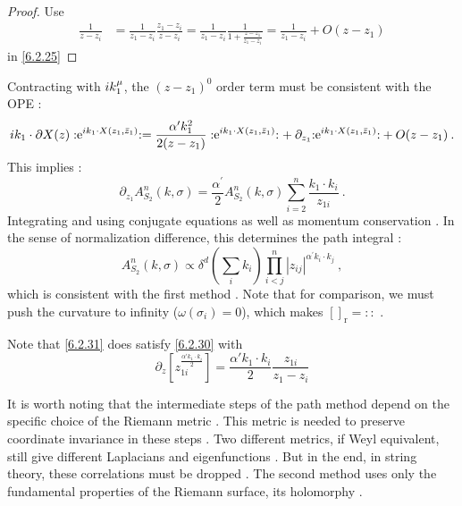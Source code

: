 \begin{tcolorbox}[breakable]
	\begin{proof}
		Use 
		\begin{align}
			\frac{1}{z-z_i} &=\frac{1}{z_1-z_i}\frac{z_1-z_i}{z-z_i}=\frac{1}{z_1-z_i}\frac{1}{1+\frac{z-z_1}{z_1-z_i}}=\frac{1}{z_1-z_i}+O(z-z_1)
		\end{align}
		in \eqref{6.2.25}
	\end{proof}
\end{tcolorbox}
Contracting with $i k_{1}^{\mu}$, the $(z-z_{1})^{0}$ order term must be consistent with the OPE :
\begin{align}
	i k_{1} \cdot \partial X(z): \mathrel{\mathrm{e}^{i k_{1} \cdot X(z_{1}, \bar{z}_{1})}}: =\frac{\alpha^{\prime} k_{1}^{2}}{2(z-z_{1})} :\mathrel{\mathrm{e}^{i k_{1} \cdot X(z_{1}, \bar{z}_{1})}}:
	+ \: \partial_{z_{1}}{:\mathrel{\mathrm{e}^{i k_{1} \cdot X(z_{1}, \bar{z}_{1})}}:}+ O(z-z_{1}) \:. \label{6.2.29}
\end{align}
This implies :
\begin{equation}
	\partial_{z_{1}} A_{S_{2}}^{n}(k, \sigma)=\frac{\alpha^{\prime}}{2} A_{S_{2}}^{n}(k, \sigma) \sum_{i=2}^{n} \frac{k_{1} \cdot k_{i}}{z_{1 i}} \:. \label{6.2.30}
\end{equation}
Integrating and using conjugate equations as well as momentum conservation . In the sense of normalization difference, this determines the path integral :
\begin{equation}
	A_{S_{2}}^{n}(k, \sigma) \propto \delta^{d}({\textstyle \sum_{i} k_{i}}) 
	\prod_{i<j}^{n} |z_{i j}|^{\alpha^{\prime} k_{i} \cdot k_{j}} \:, \label{6.2.31}
\end{equation}
which is consistent with the first method . Note that for comparison, we must push the curvature to infinity ($\omega(\sigma_{i})=0$), which makes $[]_{\mathrm{r}}=::$ .
\begin{tcolorbox}
	\begin{remark}
		Note that \eqref{6.2.31} does satisfy \eqref{6.2.30} with
		\begin{equation}
			\partial_z [z_{1i}^{\frac{\alpha' k_1\cdot k_i}{2}}] = \frac{\alpha'k_1\cdot k_i}{2} \frac{z_{1i}}{z_1-z_i}
		\end{equation}
	\end{remark}
\end{tcolorbox}
It is worth noting that the intermediate steps of the path method depend on the specific choice of the Riemann metric . This metric is needed to preserve coordinate invariance in these steps . Two different metrics, if Weyl equivalent, still give different Laplacians and eigenfunctions . But in the end, in string theory, these correlations must be dropped . The second method uses only the fundamental properties of the Riemann surface, its holomorphy .

